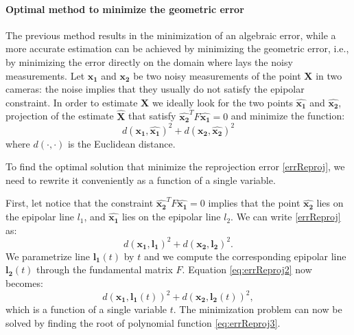 \paragraph{Optimal method to minimize the geometric error}
The previous method results in the minimization of an algebraic error, while a more accurate estimation can be achieved by minimizing the geometric error, i.e., by minimizing the error directly on the domain where lays the noisy measurements.
Let $\mathbf{x_1}$ and $\mathbf{x_2}$ be two noisy measurements of the point $\mathbf{X}$ in two cameras: the noise implies that they usually do not satisfy the epipolar constraint. In order to estimate $\mathbf{X}$ we ideally look for the two points $\hat{\mathbf{x_1}}$ and $\hat{\mathbf{x_2}}$, projection of the estimate $\hat{\mathbf{X}}$ that satisfy $\hat{\mathbf{x_2}}^{T} F \hat{\mathbf{x_1}} = 0$ and  minimize the function:
\begin{equation}
\label{eq:errReproj}
  d(\mathbf{x_1}, \hat{\mathbf{x_1}})^2 + d(\mathbf{x_2}, \hat{\mathbf{x_2}})^2
\end{equation}
where $d(\cdot,\cdot)$ is the Euclidean distance. 

To find the optimal solution that minimize the reprojection error \eqref{errReproj}, we need to rewrite it conveniently as a function of a single variable.

First, let notice that the constraint $\hat{\mathbf{x_2}}^{T} F \hat{\mathbf{x_1}} = 0$ implies that the point $\hat{\mathbf{x_2}}$ lies on the epipolar line $l_1$, and $\hat{\mathbf{x_1}}$ lies on the epipolar line $l_2$. We can write \eqref{errReproj} as:
\begin{equation}
\label{eq:errReproj2}
  d(\mathbf{x_1}, \mathbf{l_1})^2 + d(\mathbf{x_2}, \mathbf{l_2})^2.
\end{equation}
We parametrize line $\mathbf{l_1}(t)$ by $t$  and we compute the corresponding epipolar line $\mathbf{l_2}(t)$ through the fundamental matrix $F$. Equation \eqref{eq:errReproj2} now becomes:
\begin{equation}
\label{eq:errReproj3}
d(\mathbf{x_1}, \mathbf{l_1}(t))^2 + d(\mathbf{x_2}, \mathbf{l_2}(t))^2,
\end{equation}
which is a function of a single variable $t$. 
The minimization problem can now be solved by finding the root of polynomial function \eqref{eq:errReproj3}.

